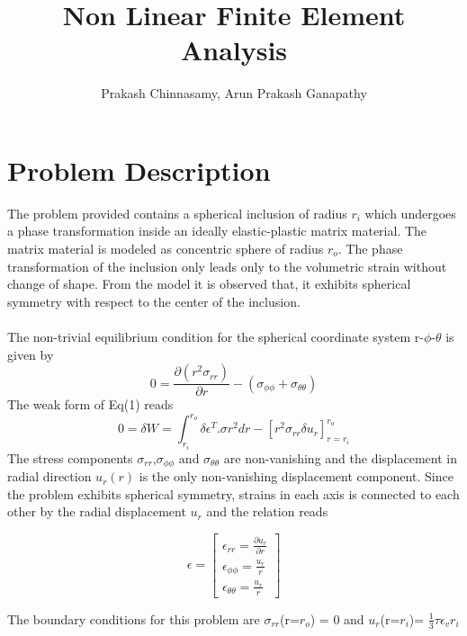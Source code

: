 \documentclass[a4paper,12pt]{article}
\title{\textbf{Non Linear Finite Element Analysis}}
\author{Prakash Chinnasamy, Arun Prakash Ganapathy}
\begin{document}
\maketitle
\newpage
\section*{Problem Description}
\indent \indent  The problem provided contains a spherical inclusion of radius $r_i$ which undergoes a phase transformation inside an ideally elastic-plastic matrix material. The matrix material is modeled as concentric sphere of radius $r_o$. The phase transformation of the inclusion only leads only to the volumetric strain without change of shape. From the model it is observed that, it exhibits spherical symmetry with respect to the center of the inclusion.\\
\\
 The non-trivial equilibrium condition for the spherical coordinate system r-$\phi$-$\theta$ is given by 
\begin{equation}
0 = \frac{\partial (r^2\sigma_{rr})}{\partial r} - (\sigma_{\phi\phi}+\sigma_{\theta\theta})
\label{strongform}
\end{equation}
The weak form of Eq(1) reads 
\begin{equation}
0 = \delta W = \int_{r_i}^{r_o} \delta\epsilon^T . \sigma r^2 dr - [r^2\sigma_{rr}\delta u_r]_{r=r_i}^{r_o}
\label{weakform}
\end{equation}
The stress components $\sigma_{rr}$,$\sigma_{\phi\phi}$ and $\sigma_{\theta\theta}$ are non-vanishing and the displacement in radial direction $u_r(r)$ is the only non-vanishing displacement component. Since the problem exhibits spherical symmetry, strains in each axis is connected to each other by the radial displacement $u_r$ and the relation reads 

\begin{equation}
\epsilon = \begin{bmatrix}
\epsilon_{rr} = \frac{\partial u_r }{\partial r}\\
\epsilon_{\phi\phi} = \frac{u_r}{r}\\
\epsilon_{\theta\theta} = \frac{u_r}{r}
\end{bmatrix}
\label{strain matrix}
\end{equation}


The boundary conditions for this problem are $\sigma_{rr}$(r=$r_o$) = 0 and $u_r$(r=$r_i$)= $\frac{1}{3}\tau\epsilon_{v}r_{i}$ 
\end{document}
